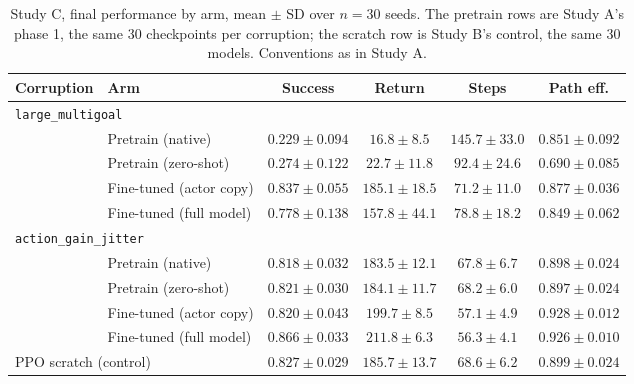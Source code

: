 \begin{table}[htbp]
\centering
\setlength{\tabcolsep}{4pt}
\caption{Study C, final performance by arm, mean $\pm$ SD over $n=30$ seeds.
The pretrain rows are Study A's phase 1, the same 30 checkpoints per corruption;
the scratch row is Study B's control, the same 30 models. Conventions as in
Study A.}
\small
\begin{tabular}{llcccc}
\toprule
Corruption & Arm & Success & Return & Steps & Path eff. \\
\midrule
\multicolumn{6}{l}{\texttt{large\_multigoal}} \\
 & Pretrain (native)       & $0.229 \pm 0.094$ & $16.8 \pm 8.5$ & $145.7 \pm 33.0$ & $0.851 \pm 0.092$ \\
 & Pretrain (zero-shot)    & $0.274 \pm 0.122$ & $22.7 \pm 11.8$ & $92.4 \pm 24.6$ & $0.690 \pm 0.085$ \\
 & Fine-tuned (actor copy) & $0.837 \pm 0.055$ & $185.1 \pm 18.5$ & $71.2 \pm 11.0$ & $0.877 \pm 0.036$ \\
 & Fine-tuned (full model) & $0.778 \pm 0.138$ & $157.8 \pm 44.1$ & $78.8 \pm 18.2$ & $0.849 \pm 0.062$ \\
\midrule
\multicolumn{6}{l}{\texttt{action\_gain\_jitter}} \\
 & Pretrain (native)       & $0.818 \pm 0.032$ & $183.5 \pm 12.1$ & $67.8 \pm 6.7$ & $0.898 \pm 0.024$ \\
 & Pretrain (zero-shot)    & $0.821 \pm 0.030$ & $184.1 \pm 11.7$ & $68.2 \pm 6.0$ & $0.897 \pm 0.024$ \\
 & Fine-tuned (actor copy) & $0.820 \pm 0.043$ & $199.7 \pm 8.5$ & $57.1 \pm 4.9$ & $0.928 \pm 0.012$ \\
 & Fine-tuned (full model) & $0.866 \pm 0.033$ & $211.8 \pm 6.3$ & $56.3 \pm 4.1$ & $0.926 \pm 0.010$ \\
\midrule
\multicolumn{2}{l}{PPO scratch (control)} & $0.827 \pm 0.029$ & $185.7 \pm 13.7$ & $68.6 \pm 6.2$ & $0.899 \pm 0.024$ \\
\bottomrule
\end{tabular}
\end{table}

